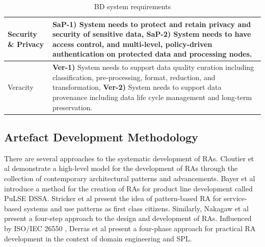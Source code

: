 \documentclass[conference]{IEEEtran}
\begin{document}
\begin{table}[h]
\begin{tabular}{|m{1.2cm}|m{16cm}|}
        \hline

        Security \& Privacy & 
        
        \textbf{SaP-1)} System needs to protect and retain privacy and security of sensitive data, \textbf{SaP-2)} System needs to have access control, and multi-level, policy-driven authentication on protected data and processing nodes. 
        \\

        \hline
        
        Veracity &
        
        \textbf{Ver-1)} System needs to support data quality curation including classification, pre-processing, format, reduction, and  transformation, \textbf{Ver-2)} System needs to support data provenance including data life cycle management and long-term preservation.
        \\
        \hline
  
    \end{tabular}
    \caption{BD system requirements}
    \label{table-requirements}
    \end{table}


\subsection{Artefact Development Methodology}
There are several approaches to the systematic development of RAs. Cloutier et al \cite{Cloutier} demonstrate a high-level model for the development of RAs through the collection of contemporary architectural patterns and advancements. Bayer et al \cite{bayer1999pulse} introduce a method for the creation of RAs for product line development called PuLSE DSSA. Stricker et al \cite{stricker2010creating} present the idea of pattern-based RA for service-based systems and use patterns as first class citizens. Similarly, Nakagaw et al \cite{nakagawa2014consolidating} present a four-step approach to the design and development of RAs. Influenced by ISO/IEC 26550 \cite{wg2015iso}, Derras et al \cite{Derras} present a four-phase approach for practical RA development in the context of domain engineering and SPL.

\end{document}
